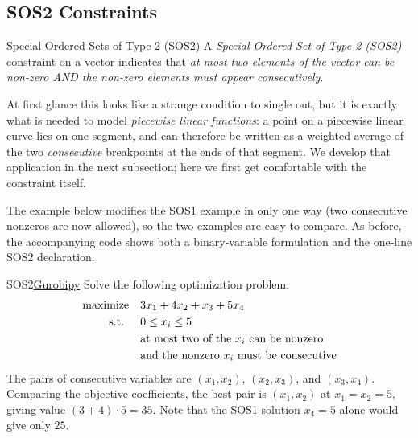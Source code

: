 \subsection{SOS2 Constraints}
\begin{definition}{Special Ordered Sets of Type 2 (SOS2)}{}
A \emph{Special Ordered Set of Type 2 (SOS2)} constraint on a vector indicates that \emph{at most two elements of the vector can be non-zero AND the non-zero elements must appear consecutively}.
\end{definition}
At first glance this looks like a strange condition to single out, but it is exactly what is needed to model \emph{piecewise linear functions}: a point on a piecewise linear curve lies on one segment, and can therefore be written as a weighted average of the two \emph{consecutive} breakpoints at the ends of that segment.  We develop that application in the next subsection; here we first get comfortable with the constraint itself.

The example below modifies the SOS1 example in only one way (two consecutive nonzeros are now allowed), so the two examples are easy to compare.  As before, the accompanying code shows both a binary-variable formulation and the one-line SOS2 declaration.

\begin{examplewithcode}{SOS2}{\href{https://github.com/open-optimization/open-optimization-or-examples/blob/master/nonlinear-programming/Gurobi-SOS-Examples.ipynb}{Gurobipy}}
\label{example:SOS2}
Solve the following optimization problem: \[\begin{aligned}
\text{maximize}\quad & 3x_1 + 4x_2 + x_3 + 5x_4 \\
\text{ s.t. } \quad & 0 \le x_i \le 5 \\
& \text{at most two of the $x_i$ can be nonzero} \\
& \text{and the nonzero $x_i$ must be consecutive}
\end{aligned}\]
The pairs of consecutive variables are $(x_1,x_2)$, $(x_2,x_3)$, and $(x_3,x_4)$.  Comparing the objective coefficients, the best pair is $(x_1, x_2)$ at $x_1 = x_2 = 5$, giving value $(3+4)\cdot 5 = 35$.  Note that the SOS1 solution $x_4=5$ alone would give only $25$.
\end{examplewithcode}

